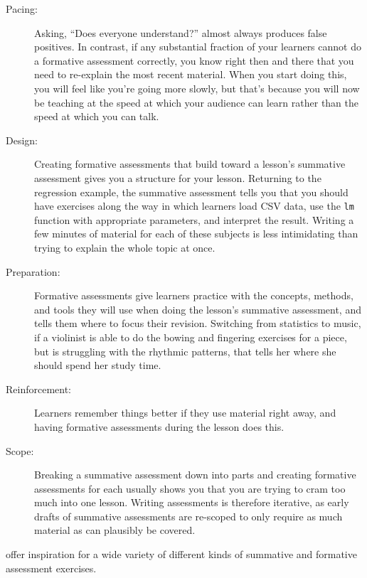\documentclass[10pt,letterpaper]{article}
\begin{document}
\begin{description}

\item[Pacing:] Asking, ``Does everyone understand?''  almost always produces
  false positives.  In contrast, if any substantial fraction of your learners
  cannot do a formative assessment correctly, you know right then and there that
  you need to re-explain the most recent material.  When you start doing this,
  you will feel like you're going more slowly, but that's because you will now
  be teaching at the speed at which your audience can learn rather than the
  speed at which you can talk.

\item[Design:] Creating formative assessments that build toward a lesson's
  summative assessment gives you a structure for your lesson.  Returning to the
  regression example, the summative assessment tells you that you should have
  exercises along the way in which learners load CSV data, use the \texttt{lm}
  function with appropriate parameters, and interpret the result.  Writing a few
  minutes of material for each of these subjects is less intimidating than
  trying to explain the whole topic at once.
  
\item[Preparation:] Formative assessments give learners practice with the
  concepts, methods, and tools they will use when doing the lesson's summative
  assessment, and tells them where to focus their revision.  Switching from
  statistics to music, if a violinist is able to do the bowing and fingering
  exercises for a piece, but is struggling with the rhythmic patterns, that
  tells her where she should spend her study time.
  
\item[Reinforcement:] Learners remember things better if they use material right
  away, and having formative assessments during the lesson does this.

\item[Scope:] Breaking a summative assessment down into parts and creating
  formative assessments for each usually shows you that you are trying to cram
  too much into one lesson.  Writing assessments is therefore iterative, as
  early drafts of summative assessments are re-scoped to only require as much
  material as can plausibly be covered.

\end{description}

\cite{Broo2016,Majo2015,Rice2018} offer inspiration for a wide variety of
different kinds of summative and formative assessment exercises.
\end{document}
